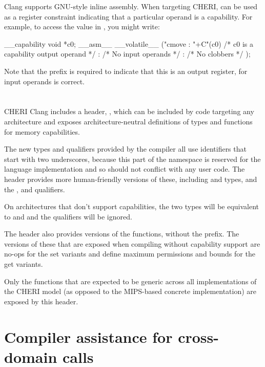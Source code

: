 Clang supports GNU-style inline assembly.
When targeting CHERI,  can be used as a register constraint indicating that a particular operand is a capability.
For example, to access the value in , you might write:

\begin{csnippet}
__capability void *c0;
__asm__ __volatile__ ("cmove %
	: "+C"(c0) /* c0 is a capability output operand */
	: /* No input operands */
	: /* No clobbers */
	);
\end{csnippet}

Note that the \ccode{+} prefix is required to indicate that this is an output register, for input operands  is correct.

\section{}

CHERI Clang includes a header, , which can be included by code targeting any architecture and exposes architecture-neutral definitions of types and functions for memory capabilities.

The new types and qualifiers provided by the compiler all use identifiers that start with two underscores, because this part of the namespace is reserved for the language implementation and so should not conflict with any user code.
The  header provides more human-friendly versions of these, including  and  types, and the ,  and  qualifiers.

On architectures that don't support capabilities, the two types will be equivalent to  and  and the qualifiers will be ignored.

The header also provides versions of the  functions, without the  prefix.
The versions of these that are exposed when compiling without capability support are no-ops for the set variants and define maximum permissions and bounds for the get variants.

Only the functions that are expected to be generic across all implementations of the CHERI model (as opposed to the MIPS-based concrete implementation) are exposed by this header.

\section{Compiler assistance for cross-domain calls}
\label{sec:cccall}

